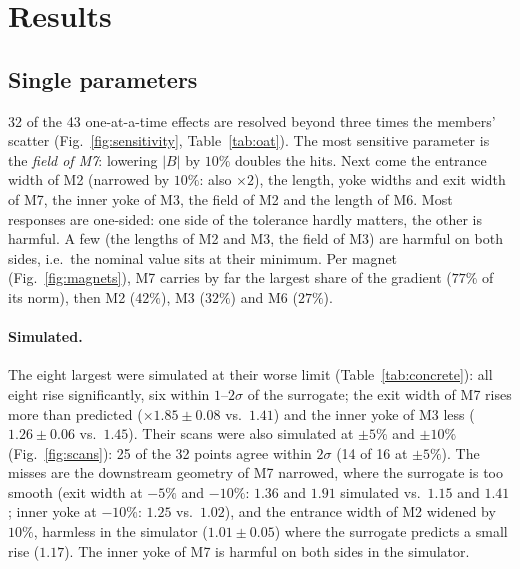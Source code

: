 \documentclass[11pt,a4paper]{article}
\begin{document}
\section{Results}

\subsection{Single parameters}

32 of the 43 one-at-a-time effects are resolved beyond three times the members' scatter
(Fig.~\ref{fig:sensitivity}, Table~\ref{tab:oat}). The most sensitive parameter is the
\emph{field of M7}: lowering $|B|$ by $10\%$ doubles the hits. Next come the entrance width of M2
(narrowed by $10\%$: also $\times2$), the length, yoke widths and exit width of M7, the inner yoke
of M3, the field of M2 and the length of M6. Most responses are one-sided: one side of the
tolerance hardly matters, the other is harmful. A few (the lengths of M2 and M3, the field of M3)
are harmful on both sides, i.e.\ the nominal value sits at their minimum. Per magnet
(Fig.~\ref{fig:magnets}), M7 carries by far the largest share of the gradient ($77\%$ of its
norm), then M2 ($42\%$), M3 ($32\%$) and M6 ($27\%$).

\paragraph{Simulated.} The eight largest were simulated at their worse limit
(Table~\ref{tab:concrete}): all eight rise significantly, six within $1$--$2\sigma$ of the
surrogate; the exit width of M7 rises more than predicted ($\times1.85\pm0.08$ vs.\ $1.41$) and
the inner yoke of M3 less ($1.26\pm0.06$ vs.\ $1.45$). Their scans were also simulated at
$\pm5\%$ and $\pm10\%$ (Fig.~\ref{fig:scans}): 25 of the 32 points agree within $2\sigma$ (14 of
16 at $\pm5\%$). The misses are the downstream geometry of M7 narrowed, where the surrogate is too
smooth (exit width at $-5\%$ and $-10\%$: $1.36$ and $1.91$ simulated vs.\ $1.15$ and $1.41$; inner
yoke at $-10\%$: $1.25$ vs.\ $1.02$), and the entrance width of M2 widened by $10\%$, harmless in
the simulator ($1.01\pm0.05$) where the surrogate predicts a small rise ($1.17$). The inner yoke of
M7 is harmful on both sides in the simulator.
\end{document}

